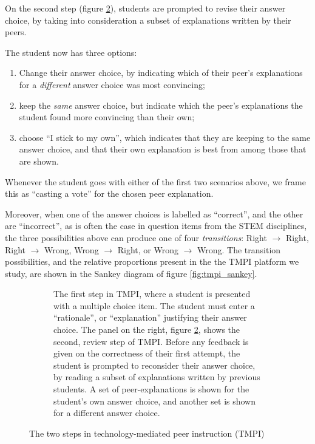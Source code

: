 \documentclass[notitlepage,12pt]{jedm}
\begin{document}
On the second step (figure \ref{fig:question_review}), students are prompted to 
revise 
their answer choice, by taking into consideration a subset of explanations 
written by their peers.

The student now has three options:
\begin{enumerate}
	\item Change their answer choice, by indicating which of their peer's 
	explanations for a \textit{different} answer choice was most convincing;
	\item keep the \textit{same} answer choice, but indicate which the peer's 
	explanations the student found more convincing than their own;
	\item choose ``I stick to my own'', which indicates that they are keeping 
	to the same answer choice, and that their own explanation is best from 
	among those that are shown.
\end{enumerate}

Whenever the student goes with either of the first two scenarios above, we 
frame this as ``casting a vote'' for the chosen peer explanation.

Moreover, when one of the answer choices is labelled as ``correct'', and the 
other are ``incorrect'', as is often the case in question items from the STEM 
disciplines, the three possibilities above can produce one of four 
\textit{transitions}: Right $\rightarrow$ Right, Right $\rightarrow$ Wrong, 
Wrong $\rightarrow$ Right, or Wrong $\rightarrow$ Wrong.
The transition possibilities, and the relative proportions present in the the 
TMPI platform we study, are shown in the Sankey diagram of figure 
\ref{fig:tmpi_sankey}.

\begin{figure}[H]
	\begin{subfigure}[b]{0.4\textwidth}
		\def\svgscale{0.50}
		
		\caption{
			The first step in TMPI, where a student is presented with a 
			multiple choice item. The student must enter a ``rationale'', or 
			``explanation'' justifying their answer choice.
			\newline
			\newline
			The panel on the right, figure \protect\ref{fig:question_review}, 
			shows the second, review step of TMPI.
			Before any feedback is given on the correctness of their first 
			attempt, the student is prompted to reconsider their answer choice, 
			by reading a subset of explanations written by previous students.
			A set of peer-explanations is shown for the student's own answer 
			choice, and another set is shown for a different answer choice. 
		}
		\label{fig:question_start}
	\end{subfigure}
	\qquad
	\begin{subfigure}[b]{0.6\textwidth}
		\def\svgscale{0.50}
		
		\caption{}
		\label{fig:question_review}
	\end{subfigure}
	\caption{The two steps in technology-mediated peer 
		instruction (TMPI)}
	\label{fig:tmpi}
\end{figure}
\end{document}
